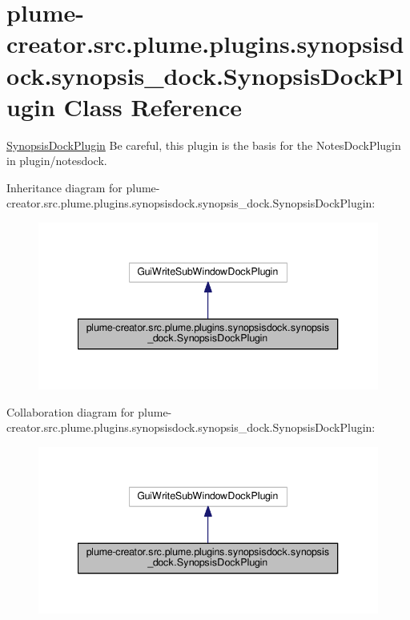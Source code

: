\hypertarget{classplume-creator_1_1src_1_1plume_1_1plugins_1_1synopsisdock_1_1synopsis__dock_1_1_synopsis_dock_plugin}{}\section{plume-\/creator.src.\+plume.\+plugins.\+synopsisdock.\+synopsis\+\_\+dock.\+Synopsis\+Dock\+Plugin Class Reference}
\label{classplume-creator_1_1src_1_1plume_1_1plugins_1_1synopsisdock_1_1synopsis__dock_1_1_synopsis_dock_plugin}


\hyperlink{classplume-creator_1_1src_1_1plume_1_1plugins_1_1synopsisdock_1_1synopsis__dock_1_1_synopsis_dock_plugin}{Synopsis\+Dock\+Plugin} Be careful, this plugin is the basis for the Notes\+Dock\+Plugin in plugin/notesdock.  




Inheritance diagram for plume-\/creator.src.\+plume.\+plugins.\+synopsisdock.\+synopsis\+\_\+dock.\+Synopsis\+Dock\+Plugin\+:\nopagebreak
\begin{figure}[H]
\begin{center}
\leavevmode
\includegraphics[width=340pt]{classplume-creator_1_1src_1_1plume_1_1plugins_1_1synopsisdock_1_1synopsis__dock_1_1_synopsis_dock_plugin__inherit__graph}
\end{center}
\end{figure}


Collaboration diagram for plume-\/creator.src.\+plume.\+plugins.\+synopsisdock.\+synopsis\+\_\+dock.\+Synopsis\+Dock\+Plugin\+:\nopagebreak
\begin{figure}[H]
\begin{center}
\leavevmode
\includegraphics[width=340pt]{classplume-creator_1_1src_1_1plume_1_1plugins_1_1synopsisdock_1_1synopsis__dock_1_1_synopsis_dock_plugin__coll__graph}
\end{center}
\end{figure}
